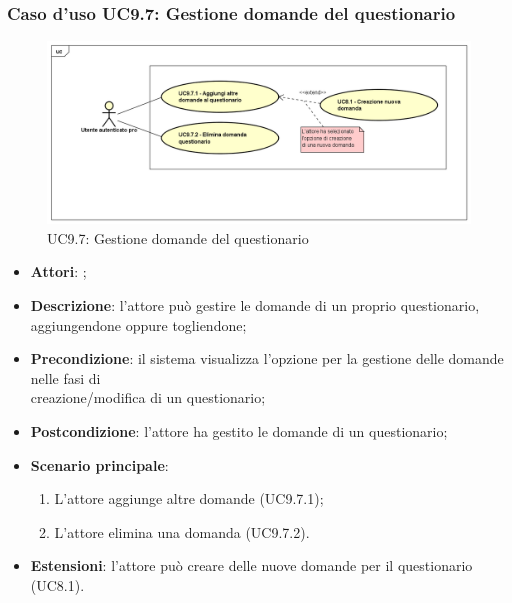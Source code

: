 	 \subsubsection{Caso d'uso UC9.7: Gestione domande del questionario}
	 \label{UC9.7}
	 \begin{figure}[h]
	 	\centering
	 	\includegraphics[scale=0.45,keepaspectratio]{UML/UC9_7.png}
	 	\caption{UC9.7: Gestione domande del questionario}
	 \end{figure}
	 \FloatBarrier
	 \begin{itemize}
	 	\item \textbf{Attori}: \uaupro{};
	 	\item \textbf{Descrizione}: l'attore può gestire le domande di un proprio questionario, aggiungendone oppure togliendone;
	 	\item \textbf{Precondizione}: il sistema visualizza l'opzione per la gestione delle domande nelle fasi di \\creazione/modifica di un questionario;
	 	\item \textbf{Postcondizione}: l'attore ha gestito le domande di un questionario;
	 	\item \textbf{Scenario principale}: 
	 	\begin{enumerate}
	 		\item L'attore aggiunge altre domande (UC9.7.1);
	 		\item L'attore elimina una domanda (UC9.7.2).
	 	\end{enumerate}
	 	\item \textbf{Estensioni}: l'attore può creare delle nuove domande per il questionario (UC8.1).		
	 \end{itemize}
	 
